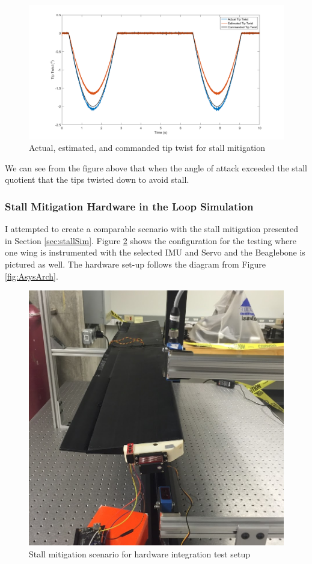 \documentclass[11pt]{ucthesis}
\begin{document}
\begin{figure}[thpb]
\centering
\includegraphics[width=1\linewidth]{Figures/StallMitigationTipTwist.png}
\caption{Actual, estimated, and commanded tip twist for stall mitigation}
\label{fig:APStall}
\end{figure}

We can see from the figure above that when the angle of attack exceeded the stall quotient that the tips twisted down to avoid stall.

\subsubsection{Stall Mitigation Hardware in the Loop Simulation}


I attempted to create a comparable scenario with the stall mitigation presented in Section \ref{sec:stallSim}. Figure \ref{fig:APHilSimStall} shows the configuration for the testing where one wing is instrumented with the selected IMU and Servo and the Beaglebone is pictured as well. The hardware set-up follows the diagram from Figure \ref{fig:AsysArch}.

\begin{figure}[thpb]
\centering
\includegraphics[width=0.5\linewidth]{Figures/IntegrationBenchtopTestingSetup.jpg}
\caption{Stall mitigation scenario for hardware integration test setup}
\label{fig:APHilSimStall}
\end{figure}
\end{document}
